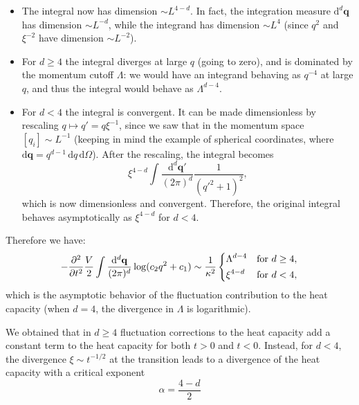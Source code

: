 \begin{itemize}
          \begin{itemize}
              \item The integral now has dimension \(\sim L^{4-d}\). In fact, the integration measure \(\mathrm{d}^d \mathbf{q}\) has dimension \(\sim L^{-d}\), while the integrand has dimension \(\sim L^4\) (since \(q^2\) and \(\xi^{-2}\) have dimension \(\sim L^{-2}\)).
              \item For \(d \geq 4\) the integral diverges at large \(q\) (going to zero), and is dominated by the momentum cutoff \(\Lambda\): we would have an integrand behaving as \(q^{-4}\) at large \(q\), and thus the integral would behave as \(\Lambda^{d-4}\).
              \item For \(d < 4\) the integral is convergent. It can be made dimensionless by rescaling \(q \mapsto q' = q \xi^{-1}\), since we saw that in the momentum space \([q_i] \sim L^{-1}\) (keeping in mind the example of spherical coordinates, where \(\mathrm{d} \mathbf{q} = q^{d-1} \, \mathrm{d} q\, \mathrm{d} \Omega\)). After the rescaling, the integral becomes
                    \[
                        \xi^{4-d}\int \frac{\mathrm{d}^d \textbf{q}'}{(2\pi)^d} \frac{1}{(q'^2 + 1)^2},
                    \]
                    which is now dimensionless and convergent. Therefore, the original integral behaves asymptotically as \(\xi^{4-d}\) for \(d < 4\).
          \end{itemize}
          Therefore we have:
          \[
              -\frac{\partial^2}{\partial t^2} \frac{V}{2} \int \frac{\mathrm{d}^d \mathbf{q}}{(2\pi)^d} \log(c_2 q^2 + c_1) \sim \frac{1}{\kappa^2} \begin{dcases}
                  \Lambda^{d-4} & \text{for } d \geq 4, \\
                  \xi^{4-d}     & \text{for } d < 4,
              \end{dcases}
          \]
          which is the asymptotic behavior of the fluctuation contribution to the heat capacity (when \(d = 4\), the divergence in \(\Lambda\) is logarithmic).

          We obtained that in \(d \geq 4\) fluctuation corrections to the heat capacity add a constant term to the heat capacity for both \( t > 0 \) and \( t < 0 \). Instead, for \( d < 4 \), the divergence \( \xi \sim t^{-1/2} \) at the transition leads to a divergence of the heat capacity with a critical exponent
          \[
              \alpha = \frac{4 - d}{2}
          \]
\end{itemize}

